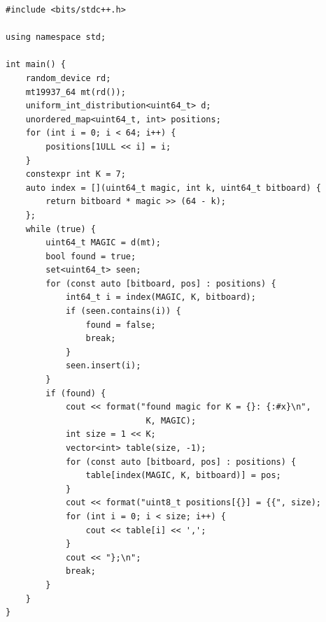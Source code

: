 \documentclass[12pt,a4paper,twoside,openright]{book}
\begin{document}
\begin{mdframed}[skipabove=\baselineskip,hidealllines=true]
\begin{verbatim}
#include <bits/stdc++.h>

using namespace std;

int main() {
    random_device rd;
    mt19937_64 mt(rd());
    uniform_int_distribution<uint64_t> d;
    unordered_map<uint64_t, int> positions;
    for (int i = 0; i < 64; i++) {
        positions[1ULL << i] = i;
    }
    constexpr int K = 7;
    auto index = [](uint64_t magic, int k, uint64_t bitboard) {
        return bitboard * magic >> (64 - k);
    };
    while (true) {
        uint64_t MAGIC = d(mt);
        bool found = true;
        set<uint64_t> seen;
        for (const auto [bitboard, pos] : positions) {
            int64_t i = index(MAGIC, K, bitboard);
            if (seen.contains(i)) {
                found = false;
                break;
            }
            seen.insert(i);
        }
        if (found) {
            cout << format("found magic for K = {}: {:#x}\n", 
                            K, MAGIC);
            int size = 1 << K;
            vector<int> table(size, -1);
            for (const auto [bitboard, pos] : positions) {
                table[index(MAGIC, K, bitboard)] = pos;
            }
            cout << format("uint8_t positions[{}] = {{", size);
            for (int i = 0; i < size; i++) {
                cout << table[i] << ',';
            }
            cout << "};\n";
            break;
        }
    }
}
\end{verbatim}
\label{lst:random_magic}
\end{mdframed}
\end{document}
